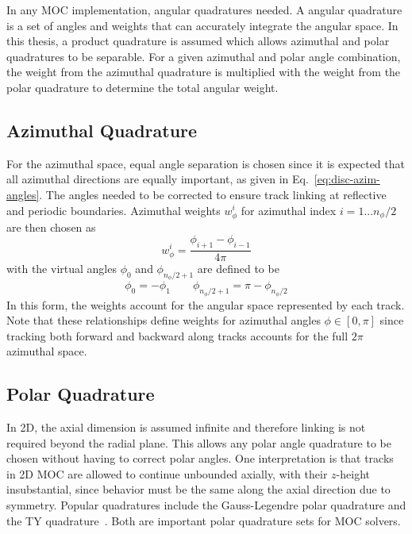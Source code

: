 In any \ac{MOC} implementation, angular quadratures needed. A angular quadrature is a set of angles and weights that can accurately integrate the angular space. In this thesis, a product quadrature is assumed which allows azimuthal and polar quadratures to be separable. For a given azimuthal and polar angle combination, the weight from the azimuthal quadrature is multiplied with the weight from the polar quadrature to determine the total angular weight.

\subsection{Azimuthal Quadrature}

For the azimuthal space, equal angle separation is chosen since it is expected that all azimuthal directions are equally important, as given in Eq.~\ref{eq:disc-azim-angles}. The angles needed to be corrected to ensure track linking at reflective and periodic boundaries. Azimuthal weights $w_{\phi}^i$ for azimuthal index $i=1...{n_\phi/2}$ are then chosen as
\begin{equation}
w_{\phi}^i = \frac{\phi_{i+1} - \phi_{i-1}}{4\pi}
\end{equation}
with the virtual angles $\phi_{0}$ and $\phi_{n_\phi/2+1}$ are defined to be
\begin{equation}
\phi_0 = - \phi_1 \qquad \phi_{n_\phi/2+1} = \pi - \phi_{n_\phi/2}
\end{equation}
In this form, the weights account for the angular space represented by each track. Note that these relationships define weights for azimuthal angles $\phi \in [0, \pi]$ since tracking both forward and backward along tracks accounts for the full $2\pi$ azimuthal space.

\subsection{Polar Quadrature}

In 2D, the axial dimension is assumed infinite and therefore linking is not required beyond the radial plane. This allows any polar angle quadrature to be chosen without having to correct polar angles. One interpretation is that tracks in 2D \ac{MOC} are allowed to continue unbounded axially, with their $z$-height insubstantial, since behavior must be the same along the axial direction due to symmetry. Popular quadratures include the Gauss-Legendre polar quadrature and the TY quadrature~\cite{ty-quadrature}. Both are important polar quadrature sets for \ac{MOC} solvers.

